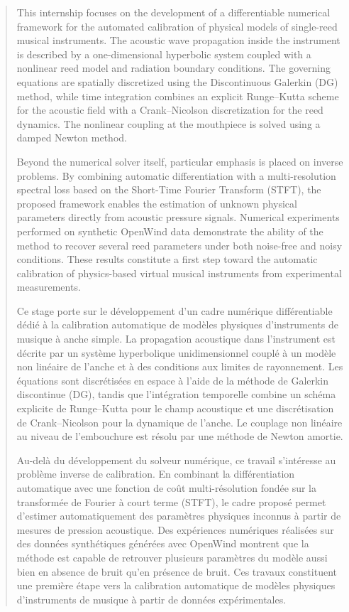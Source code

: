 \documentclass[11pt,a4paper]{report}
\theoremstyle{plain}
\theoremstyle{definition}
\begin{document}
\begin{abstract}

This internship focuses on the development of a differentiable numerical framework for the automated calibration of physical models of single-reed musical instruments. The acoustic wave propagation inside the instrument is described by a one-dimensional hyperbolic system coupled with a nonlinear reed model and radiation boundary conditions. The governing equations are spatially discretized using the Discontinuous Galerkin (DG) method, while time integration combines an explicit Runge--Kutta scheme for the acoustic field with a Crank--Nicolson discretization for the reed dynamics. The nonlinear coupling at the mouthpiece is solved using a damped Newton method.

Beyond the numerical solver itself, particular emphasis is placed on inverse problems. By combining automatic differentiation with a multi-resolution spectral loss based on the Short-Time Fourier Transform (STFT), the proposed framework enables the estimation of unknown physical parameters directly from acoustic pressure signals. Numerical experiments performed on synthetic OpenWind data demonstrate the ability of the method to recover several reed parameters under both noise-free and noisy conditions. These results constitute a first step toward the automatic calibration of physics-based virtual musical instruments from experimental measurements.

\vspace{3em}

Ce stage porte sur le développement d'un cadre numérique différentiable dédié à la calibration automatique de modèles physiques d'instruments de musique à anche simple. La propagation acoustique dans l'instrument est décrite par un système hyperbolique unidimensionnel couplé à un modèle non linéaire de l'anche et à des conditions aux limites de rayonnement. Les équations sont discrétisées en espace à l'aide de la méthode de Galerkin discontinue (DG), tandis que l'intégration temporelle combine un schéma explicite de Runge--Kutta pour le champ acoustique et une discrétisation de Crank--Nicolson pour la dynamique de l'anche. Le couplage non linéaire au niveau de l'embouchure est résolu par une méthode de Newton amortie.

Au-delà du développement du solveur numérique, ce travail s'intéresse au problème inverse de calibration. En combinant la différentiation automatique avec une fonction de coût multi-résolution fondée sur la transformée de Fourier à court terme (STFT), le cadre proposé permet d'estimer automatiquement des paramètres physiques inconnus à partir de mesures de pression acoustique. Des expériences numériques réalisées sur des données synthétiques générées avec OpenWind montrent que la méthode est capable de retrouver plusieurs paramètres du modèle aussi bien en absence de bruit qu'en présence de bruit. Ces travaux constituent une première étape vers la calibration automatique de modèles physiques d'instruments de musique à partir de données expérimentales.

\end{abstract}
\end{document}
